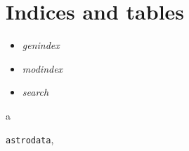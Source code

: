 \documentclass[letterpaper,10pt,english]{sphinxmanual}
\begin{document}
\chapter{Indices and tables}
\label{index:indices-and-tables}\begin{itemize}
\item {} 
\emph{genindex}

\item {} 
\emph{modindex}

\item {} 
\emph{search}

\end{itemize}


\renewcommand{\indexname}{Python Module Index}
\begin{theindex}
\def\bigletter#1{{\Large\sffamily#1}\nopagebreak\vspace{1mm}}
\bigletter{a}
\item {\texttt{astrodata}}, \pageref{astro_class:module-astrodata}
\end{theindex}

\renewcommand{\indexname}{Index}
\printindex
\end{document}
